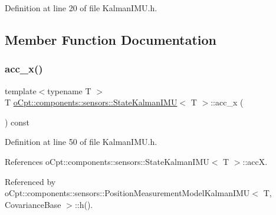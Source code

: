 Definition at line 20 of file Kalman\+I\+M\+U.\+h.



\subsection{Member Function Documentation}
\hypertarget{classo_cpt_1_1components_1_1sensors_1_1_state_kalman_i_m_u_a3d94faa4400f2fb4646140ee09590eca}{}\label{classo_cpt_1_1components_1_1sensors_1_1_state_kalman_i_m_u_a3d94faa4400f2fb4646140ee09590eca} 
\subsubsection{\texorpdfstring{acc\+\_\+x()}{acc\_x()}\hspace{0.1cm}{\footnotesize\ttfamily [1/2]}}
{\footnotesize\ttfamily template$<$typename T $>$ \\
T \hyperlink{classo_cpt_1_1components_1_1sensors_1_1_state_kalman_i_m_u}{o\+Cpt\+::components\+::sensors\+::\+State\+Kalman\+I\+MU}$<$ T $>$\+::acc\+\_\+x (\begin{DoxyParamCaption}{ }\end{DoxyParamCaption}) const\hspace{0.3cm}{\ttfamily [inline]}}



Definition at line 50 of file Kalman\+I\+M\+U.\+h.



References o\+Cpt\+::components\+::sensors\+::\+State\+Kalman\+I\+M\+U$<$ T $>$\+::accX.



Referenced by o\+Cpt\+::components\+::sensors\+::\+Position\+Measurement\+Model\+Kalman\+I\+M\+U$<$ T, Covariance\+Base $>$\+::h().

